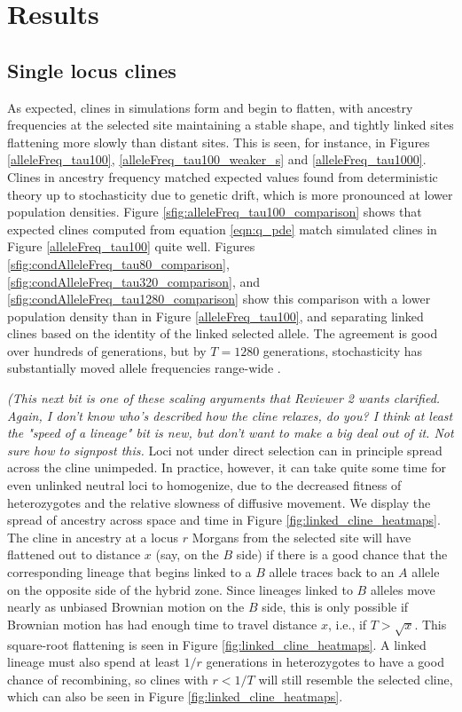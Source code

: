\documentclass[11pt,letterpaper]{article}
\newcommand{\plr}[1]{{\em \color{blue} #1}}
\begin{document}
\section*{Results}


\subsection*{Single locus clines}

As expected, clines in simulations form and begin to flatten, 
with ancestry frequencies at the selected site maintaining a stable shape,
and tightly linked sites flattening more slowly than distant sites.
This is seen, for instance, in Figures \ref{alleleFreq_tau100},
\ref{alleleFreq_tau100_weaker_s} and \ref{alleleFreq_tau1000}. 
Clines in ancestry frequency matched expected values found from deterministic theory
up to stochasticity due to genetic drift, which is more pronounced at lower population densities.
Figure \ref{sfig:alleleFreq_tau100_comparison} shows that expected clines computed from equation \eqref{eqn:q_pde}
match simulated clines in Figure \ref{alleleFreq_tau100} quite well.
Figures \ref{sfig:condAlleleFreq_tau80_comparison}, \ref{sfig:condAlleleFreq_tau320_comparison}, and \ref{sfig:condAlleleFreq_tau1280_comparison}
show this comparison with a lower population density than in Figure \ref{alleleFreq_tau100},
and separating linked clines based on the identity of the linked selected allele.
The agreement is good over hundreds of generations, but by $T=1280$ generations,
stochasticity has substantially moved allele frequencies range-wide
\citep[which is unsurprising, as the total population size is only 5,000 diploids:][]{Polechova2011}.

\plr{(This next bit is one of these scaling arguments that Reviewer 2 wants clarified.  Again, I don't know who's described how the cline relaxes, do you?  I think at least the "speed of a lineage" bit is new, but don't want to make a big deal out of it.  Not sure how to signpost this.}
Loci not under direct selection can in principle spread across the cline unimpeded. 
In practice, however, it can take quite some time for even unlinked neutral loci to homogenize,
due to the decreased fitness of heterozygotes \citep{barton1986barrier}
and the relative slowness of diffusive movement.
We display the spread of ancestry across space and time in Figure \ref{fig:linked_cline_heatmaps}. 
The cline in ancestry at a locus $r$ Morgans from the selected site
will have flattened out to distance $x$ (say, on the $B$ side)
if there is a good chance that the corresponding lineage that begins linked to a $B$ allele
traces back to an $A$ allele on the opposite side of the hybrid zone.
Since lineages linked to $B$ alleles move nearly as unbiased Brownian motion on the $B$ side,
this is only possible if Brownian motion has had enough time to travel distance $x$,
i.e., if $T>\sqrt{x}$.
This square-root flattening is seen in Figure \ref{fig:linked_cline_heatmaps}.
A linked lineage must also spend at least $1/r$ generations in heterozygotes
to have a good chance of recombining,
so clines with $r<1/T$ will still resemble the selected cline,
which can also be seen in Figure \ref{fig:linked_cline_heatmaps}.
\end{document}
